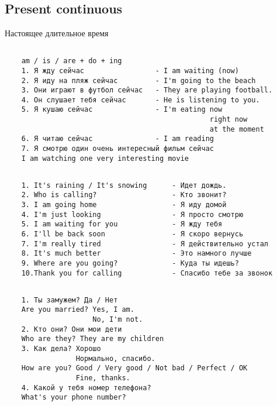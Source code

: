 \subsection{Present continuous}
Настоящее длительное время
\subsection*{}
\begin{verbatim}
    am / is / are + do + ing
    1. Я жду сейчас                 - I am waiting (now)
    2. Я иду на пляж сейчас         - I'm going to the beach
    3. Они играют в футбол сейчас   - They are playing football.
    4. Он слушает тебя сейчас       - He is listening to you.
    5. Я кушаю сейчас               - I'm eating now
                                                 right now
                                                 at the moment
    6. Я читаю сейчас               - I am reading
    7. Я смотрю один очень интересный фильм сейчас
    I am watching one very interesting movie
\end{verbatim}

\subsection*{}
\begin{verbatim}
    1. It's raining / It's snowing      - Идет дождь.
    2. Who is calling?                  - Кто звонит?
    3. I am going home                  - Я иду домой
    4. I'm just looking                 - Я просто смотрю
    5. I am waiting for you             - Я жду тебя
    6. I'll be back soon                - Я скоро вернусь
    7. I'm really tired                 - Я действительно устал
    8. It's much better                 - Это намного лучше
    9. Where are you going?             - Куда ты идешь?
    10.Thank you for calling            - Спасибо тебе за звонок
\end{verbatim}

\subsection*{}
\begin{verbatim}
    1. Ты замужем? Да / Нет
    Are you married? Yes, I am.
                     No, I'm not.
    2. Кто они? Они мои дети
    Who are they? They are my children
    3. Как дела? Хорошо
                 Нормально, спасибо.
    How are you? Good / Very good / Not bad / Perfect / OK
                 Fine, thanks.
    4. Какой у тебя номер телефона?
    What's your phone number?
\end{verbatim}

